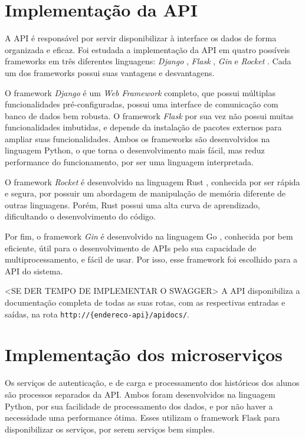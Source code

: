 \section{Implementação da API}

A API é responsável por servir disponibilizar à interface os dados de forma organizada e eficaz. Foi estudada a implementação da API em quatro possíveis frameworks em três diferentes linguagens:
\textit{Django} \cite{site-django}, \textit{Flask} \cite{site-flask}, \textit{Gin} \cite{site-gin} e \textit{Rocket} \cite{site-rocket}. Cada um dos frameworks possui suas vantagens e desvantagens.

O framework \textit{Django} é um \textit{Web Framework} completo, que possui múltiplas funcionalidades pré-configuradas, possui uma interface de comunicação com banco de dados bem robusta. O framework \textit{Flask} por sua vez não possui muitas funcionalidades imbutidas, e depende da instalação de pacotes externos para ampliar suas funcionalidades. Ambos os frameworks são desenvolvidos na linguagem Python, o que torna o desenvolvimento mais fácil, mas reduz performance do funcionamento, por ser uma linguagem interpretada.

O framework \textit{Rocket} é desenvolvido na linguagem Rust \cite{site-rust}, conhecida por ser rápida e segura, por possuir um abordagem de manipulação de memória diferente de outras linguagens. Porém, Rust possui uma alta curva de aprendizado, dificultando o desenvolvimento do código.

Por fim, o framework \textit{Gin} é desenvolvido na linguagem Go \cite{site-go}, conhecida por bem eficiente, útil para o desenvolvimento de APIs pelo sua capacidade de multiprocessamento, e fácil de usar. Por isso, esse framework foi escolhido para a API do sistema.

<SE DER TEMPO DE IMPLEMENTAR O SWAGGER> A API disponibiliza a documentação completa de todas as suas rotas, com as respectivas entradas e saídas, na rota \verb|http://{endereco-api}/apidocs/|. 

\section{Implementação dos microserviços}

Os serviços de autenticação, e de carga e processamento dos históricos dos alunos são processos separados da API. Ambos foram desenvolvidos na linguagem Python, por sua facilidade de processamento dos dados, e por não haver a necessidade uma performance ótima. Esses utilizam o framework Flask para disponibilizar os serviços, por serem serviços bem simples.

